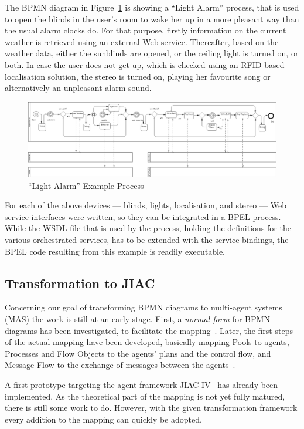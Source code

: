 The BPMN diagram in Figure~\ref{fig:example} is showing a ``Light Alarm'' process, that is used to open the blinds in the user's room to wake her up in a more pleasant way than the usual alarm clocks do.  For that purpose, firstly information on the current weather is retrieved using an external Web service.  Thereafter, based on the weather data, either the sunblinds are opened, or the ceiling light is turned on, or both.  In case the user does not get up, which is checked using an RFID based localisation solution, the stereo is turned on, playing her favourite song or alternatively an unpleasant alarm sound.

\begin{figure}%
	\centering
	\includegraphics[width=\textwidth]{img/demo_lichtwecker_kompakt.png}
	\caption{``Light Alarm'' Example Process}
	\label{fig:example}
\end{figure}

For each of the above devices --- blinds, lights, localisation, and stereo --- Web service interfaces were written, so they can be integrated in a BPEL process.  While the WSDL file that is used by the process, holding the definitions for the various orchestrated services, has to be extended with the service bindings, the BPEL code resulting from this example is readily executable.


\subsection{Transformation to JIAC}
\label{sec:trafo_jiac}

Concerning our goal of transforming BPMN diagrams to multi-agent systems (MAS) the work is still at an early stage.  First, a \emph{normal form} for BPMN diagrams has been investigated, to facilitate the mapping~\cite{endert2007towards}.  Later, the first steps of the actual mapping have been developed, basically mapping Pools to agents, Processes and Flow Objects to the agents' plans and the control flow, and Message Flow to the exchange of messages between the agents~\cite{endert2007mapping}.

A first prototype targeting the agent framework JIAC IV~\cite{sesseler2002modularearchitektur} has already been implemented.  As the theoretical part of the mapping is not yet fully matured, there is still some work to do.  However, with the given transformation framework every addition to the mapping can quickly be adopted.
